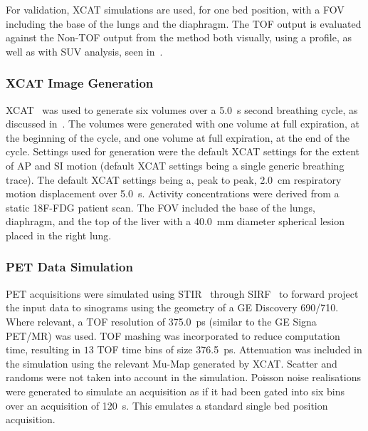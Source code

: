             For validation, \gls{XCAT} simulations are used, for one bed position, with a \gls{FOV} including the base of the lungs and the diaphragm. The \gls{TOF} output is evaluated against the \gls{Non-TOF} output from the method both visually, using a profile, as well as with \gls{SUV} analysis, seen in~.
            
            \subsubsection{XCAT Image Generation} \label{sec:impact_of_tof_on_respiratory_motion_model_estimation_using_pre_gated_no_intra_cycle_motion_nac_pet_methods_xcat_image_generation}
                \gls{XCAT}~\parencite{Segars2010} was used to generate six volumes over a \SI{5.0}{\second} second breathing cycle, as discussed in~. The volumes were generated with one volume at full expiration, at the beginning of the cycle, and one volume at full expiration, at the end of the cycle. Settings used for generation were the default \gls{XCAT} settings for the extent of \gls{AP} and \gls{SI} motion (default \gls{XCAT} settings being a single generic breathing trace). The default \gls{XCAT} settings being a, peak to peak, \SI{2.0}{\centi\metre} respiratory motion displacement over \SI{5.0}{\second}. Activity concentrations were derived from a static \gls{18F-FDG} patient scan. The \gls{FOV} included the base of the lungs, diaphragm, and the top of the liver with a \SI{40.0}{\milli\metre} diameter spherical lesion placed in the right lung.
            
            \subsubsection{PET Data Simulation} \label{sec:impact_of_tof_on_respiratory_motion_model_estimation_using_pre_gated_no_intra_cycle_motion_nac_pet_methods_pet_data_simulation}
                \gls{PET} acquisitions were simulated using \gls{STIR}~\parencite{Thielemans2012} through \gls{SIRF}~\parencite{Ovtchinnikov2017} to forward project the input data to sinograms using the geometry of a \gls{GE} Discovery 690/710. Where relevant, a \gls{TOF} resolution of \SI{375.0}{\pico\second} (similar to the \gls{GE} Signa \gls{PET}/\gls{MR}) was used. \gls{TOF} mashing was incorporated to reduce computation time, resulting in $13$ \gls{TOF} time bins of size \SI{376.5}{\pico\second}. Attenuation was included in the simulation using the relevant \gls{Mu-Map} generated by \gls{XCAT}. Scatter and randoms were not taken into account in the simulation. Poisson noise realisations were generated to simulate an acquisition as if it had been gated into six bins over an acquisition of \SI{120}{\second}. This emulates a standard single bed position acquisition. 
            
